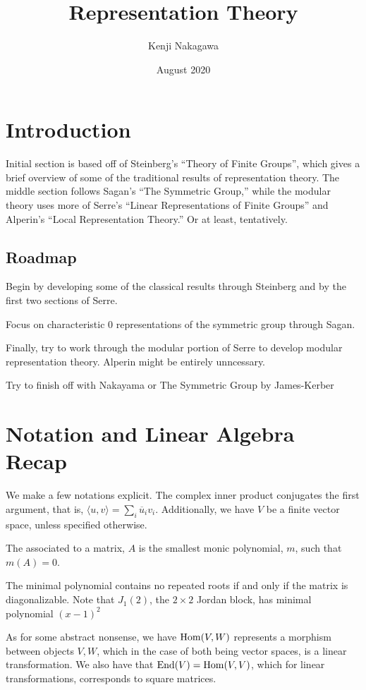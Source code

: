 \documentclass{article}
\title{Representation Theory}
\author{Kenji Nakagawa}
\date{August 2020}
\begin{document}
\maketitle
\tableofcontents

\section*{Introduction}
Initial section is based off of Steinberg's ``Theory of Finite Groups'', which gives a brief overview of some of the traditional results of representation theory. The middle section follows Sagan's ``The Symmetric Group,'' while the modular theory uses more of Serre's ``Linear Representations of Finite Groups'' and Alperin's ``Local Representation Theory.'' Or at least, tentatively.

\subsection{Roadmap}
Begin by developing some of the classical results through Steinberg and by the first two sections of Serre.

Focus on characteristic $0$ representations of the symmetric group through Sagan.

Finally, try to work through the modular portion of Serre to develop modular representation theory. Alperin might be entirely unncessary.

Try to finish off with Nakayama or The Symmetric Group by James-Kerber

\section{Notation and Linear Algebra Recap}
We make a few notations explicit. The complex inner product conjugates the first argument, that is, $\langle u, v \rangle = \sum_i \overline{u}_iv_i$. Additionally, we have $V$ be a finite vector space, unless specified otherwise.


\begin{definition}
The  associated to a matrix, $A$ is the smallest monic polynomial, $m$, such that $m(A)=0$.
\end{definition}
The minimal polynomial contains no repeated roots if and only if the matrix is diagonalizable. Note that $J_1(2)$, the $2 \times 2$ Jordan block, has minimal polynomial $(x-1)^2$

As for some abstract nonsense, we have $\operatorname{Hom}(V,W)$ represents a morphism between objects $V,W$, which in the case of both being vector spaces, is a linear transformation. We also have that $\operatorname{End}(V) = \operatorname{Hom}(V,V)$, which for linear transformations, corresponds to square matrices.
\end{document}
